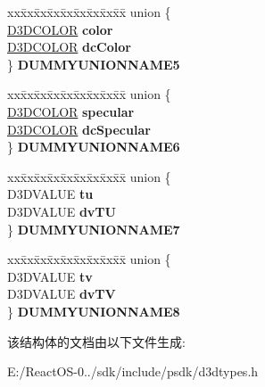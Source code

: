 \begin{DoxyCompactItemize}
\begin{tabbing}
\end{tabbing}\item 
\mbox{\label{struct___d3_d_t_l_v_e_r_t_e_x_aafd526e483df9a4aa01884a6913ee6e1}} 
\begin{tabbing}
xx\=xx\=xx\=xx\=xx\=xx\=xx\=xx\=xx\=\kill
union \{\\
\>\hyperlink{struct_d3_d_c_o_l_o_r}{D3DCOLOR} {\bfseries color}\\
\>\hyperlink{struct_d3_d_c_o_l_o_r}{D3DCOLOR} {\bfseries dcColor}\\
\} {\bfseries DUMMYUNIONNAME5}\\

\end{tabbing}\item 
\mbox{\label{struct___d3_d_t_l_v_e_r_t_e_x_af5b320f5cefc646fadc9907e8859c76c}} 
\begin{tabbing}
xx\=xx\=xx\=xx\=xx\=xx\=xx\=xx\=xx\=\kill
union \{\\
\>\hyperlink{struct_d3_d_c_o_l_o_r}{D3DCOLOR} {\bfseries specular}\\
\>\hyperlink{struct_d3_d_c_o_l_o_r}{D3DCOLOR} {\bfseries dcSpecular}\\
\} {\bfseries DUMMYUNIONNAME6}\\

\end{tabbing}\item 
\mbox{\label{struct___d3_d_t_l_v_e_r_t_e_x_ac28bcd3c803e5d0dc81b09e024a888e8}} 
\begin{tabbing}
xx\=xx\=xx\=xx\=xx\=xx\=xx\=xx\=xx\=\kill
union \{\\
\>D3DVALUE {\bfseries tu}\\
\>D3DVALUE {\bfseries dvTU}\\
\} {\bfseries DUMMYUNIONNAME7}\\

\end{tabbing}\item 
\mbox{\label{struct___d3_d_t_l_v_e_r_t_e_x_a0d2291a1829aabfc7b6f0aa0f42fb4a8}} 
\begin{tabbing}
xx\=xx\=xx\=xx\=xx\=xx\=xx\=xx\=xx\=\kill
union \{\\
\>D3DVALUE {\bfseries tv}\\
\>D3DVALUE {\bfseries dvTV}\\
\} {\bfseries DUMMYUNIONNAME8}\\

\end{tabbing}\end{DoxyCompactItemize}


该结构体的文档由以下文件生成\+:\begin{DoxyCompactItemize}
\item 
E\+:/\+React\+O\+S-\/0../sdk/include/psdk/d3dtypes.\+h\end{DoxyCompactItemize}

